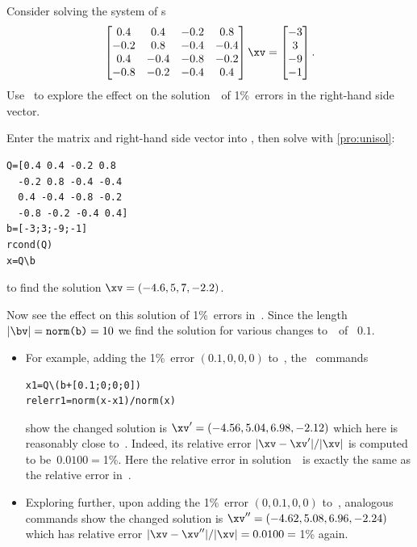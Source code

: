 \begin{example}  
Consider solving the system of s
\begin{equation*}
\begin{bmatrix} 0.4&0.4&-0.2&0.8
\\-0.2&0.8&-0.4&-0.4
\\0.4&-0.4&-0.8&-0.2
\\-0.8&-0.2&-0.4&0.4 \end{bmatrix}\xv
=\begin{bmatrix} -3\\3\\-9\\-1 \end{bmatrix}.
\end{equation*}
Use \script\ to explore the effect on the solution~\xv\ of 1\%~errors in the right-hand side vector.
\begin{solution} 
Enter the matrix and right-hand side vector into \script, then solve  with \cref{pro:unisol}:
\setbox\ajrqrbox\hbox{}%
\marginajrbox%
\begin{verbatim}
Q=[0.4 0.4 -0.2 0.8
  -0.2 0.8 -0.4 -0.4
  0.4 -0.4 -0.8 -0.2
  -0.8 -0.2 -0.4 0.4]
b=[-3;3;-9;-1]
rcond(Q)
x=Q\b
\end{verbatim}
to find the solution \(\xv=(-4.6,5,7,-2.2)\).

Now see the effect on this solution of 1\%~errors in~\bv.
Since the length \(|\bv|=\verb|norm(b)|=10\) we find the solution for various changes to~\bv\ of ~\(0.1\).
\begin{itemize}\sloppy
\item For example, adding the 1\%~error \((0.1,0,0,0)\) to~\bv, the \script\ commands
\begin{verbatim}
x1=Q\(b+[0.1;0;0;0])
relerr1=norm(x-x1)/norm(x)
\end{verbatim}
show the changed solution is \(\xv'=(-4.56,5.04,6.98,-2.12)\) which here is reasonably close to~\xv.
Indeed, its relative error \(|\xv-\xv'|/|\xv|\) is computed to be~\(0.0100={}\)1\%.
Here the relative error in solution~\xv\ is exactly the same as the relative error in~\bv.

\item Exploring further, upon adding the 1\%~error \((0,0.1,0,0)\) to~\bv, analogous commands show the changed solution is \(\xv''=(-4.62,5.08,6.96,-2.24)\) which has relative error \(|\xv-\xv''|/|\xv|=0.0100={}\)1\% again.


\end{itemize}
\end{solution}
\end{example}
